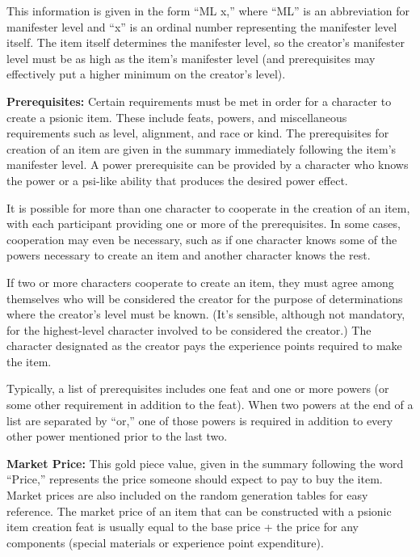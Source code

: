 This information is given in the form ``ML x,'' where ``ML'' is an abbreviation for manifester level and ``x'' is an ordinal number representing the manifester level itself. The item itself determines the manifester level, so the creator's manifester level must be as high as the item's manifester level (and prerequisites may effectively put a higher minimum on the creator's level).

\textbf{Prerequisites:} Certain requirements must be met in order for a character to create a psionic item. These include feats, powers, and miscellaneous requirements such as level, alignment, and race or kind. The prerequisites for creation of an item are given in the summary immediately following the item's manifester level. A power prerequisite can be provided by a character who knows the power or a psi-like ability that produces the desired power effect.

It is possible for more than one character to cooperate in the creation of an item, with each participant providing one or more of the prerequisites. In some cases, cooperation may even be necessary, such as if one character knows some of the powers necessary to create an item and another character knows the rest.

If two or more characters cooperate to create an item, they must agree among themselves who will be considered the creator for the purpose of determinations where the creator's level must be known. (It's sensible, although not mandatory, for the highest-level character involved to be considered the creator.) The character designated as the creator pays the experience points required to make the item.

Typically, a list of prerequisites includes one feat and one or more powers (or some other requirement in addition to the feat). When two powers at the end of a list are separated by ``or,'' one of those powers is required in addition to every other power mentioned prior to the last two.

\textbf{Market Price:} This gold piece value, given in the summary following the word ``Price,'' represents the price someone should expect to pay to buy the item. Market prices are also included on the random generation tables for easy reference. The market price of an item that can be constructed with a psionic item creation feat is usually equal to the base price + the price for any components (special materials or experience point expenditure).

